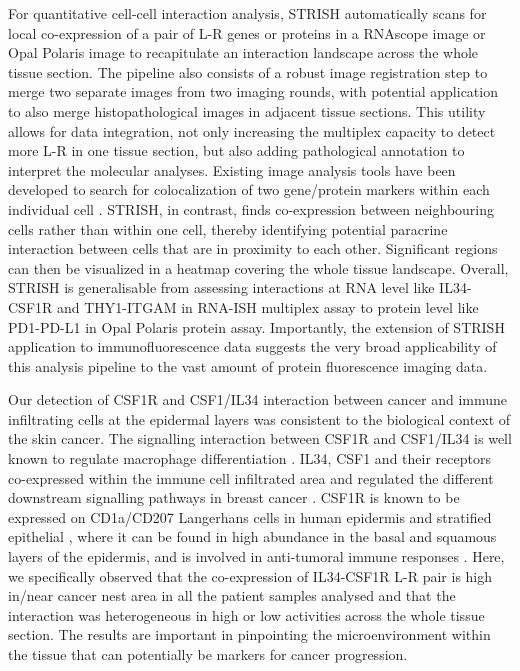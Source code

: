 For quantitative cell-cell interaction analysis, STRISH automatically scans for local co-expression of a pair of L-R genes or proteins in a RNAscope image or Opal Polaris image to recapitulate an interaction landscape across the whole tissue section. The pipeline also consists of a robust image registration step to merge two separate images from two imaging rounds, with potential application to also merge histopathological images in adjacent tissue sections. This utility allows for data integration, not only increasing the multiplex capacity to detect more L-R in one tissue section, but also adding pathological annotation to interpret the molecular analyses. Existing image analysis tools have been developed to search for colocalization of two gene/protein markers within each individual cell \cite{bolte2006guided}. STRISH, in contrast, finds co-expression between neighbouring cells rather than within one cell, thereby identifying potential paracrine interaction between cells that are in proximity to each other. Significant regions can then be visualized in a heatmap covering the whole tissue landscape. Overall, STRISH is generalisable from assessing interactions at RNA level like IL34-CSF1R and THY1-ITGAM in RNA-ISH multiplex assay to protein level like PD1-PD-L1 in Opal Polaris protein assay. Importantly, the extension of STRISH application to immunofluorescence data suggests the very broad applicability of this analysis pipeline to the vast amount of protein fluorescence imaging data. 

Our detection of CSF1R and CSF1/IL34 interaction between cancer and immune infiltrating cells at the epidermal layers was consistent to the biological context of the skin cancer. The signalling interaction between CSF1R and CSF1/IL34 is well known to regulate macrophage differentiation \cite{lin2008discovery}. IL34, CSF1 and their receptors co-expressed within the immune cell infiltrated area and regulated the different downstream signalling pathways in breast cancer \cite{zins2018differential}. CSF1R is known to be expressed on CD1a/CD207 Langerhans cells in human epidermis and stratified epithelial \cite{lonardi2020csf1r}, where it can be found in high abundance in the basal and squamous layers of the epidermis, and is involved in anti-tumoral immune responses \cite{pogorzelska2020density}. Here, we specifically observed that the co-expression of IL34-CSF1R L-R pair is high in/near cancer nest area in all the patient samples analysed and that the interaction was heterogeneous in high or low activities across the whole tissue section. The results are important in pinpointing the microenvironment within the tissue that can potentially be markers for cancer progression.

